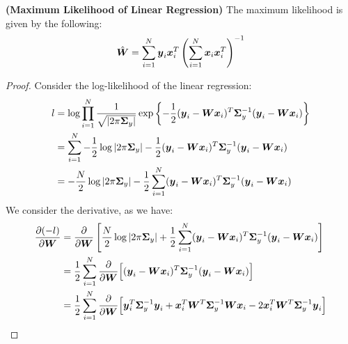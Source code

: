 \begin{proposition}{\textbf{(Maximum Likelihood of Linear Regression)}}
    The maximum likelihood is given by the following:
    \begin{equation*}
        \hat{\boldsymbol W} = \sum^N_{i=1}\boldsymbol y_i\boldsymbol x_i^T\left( \sum^N_{i=1}\boldsymbol x_i\boldsymbol x_i^T \right)^{-1}
    \end{equation*}
\end{proposition}
\begin{proof}
    Consider the log-likelihood of the linear regression:
    \begin{equation*}
    \begin{aligned}
        l &= \log \prod^N_{i=1} \frac{1}{\sqrt{\left| 2\pi\boldsymbol \Sigma_y \right|}} \exp\left\{ -\frac{1}{2}(\boldsymbol y_i - \boldsymbol W\boldsymbol x_i)^T\boldsymbol \Sigma_y^{-1}(\boldsymbol y_i - \boldsymbol W\boldsymbol x_i) \right\} \\
        &= \sum^N_{i=1} -\frac{1}{2}\log \left| 2\pi\boldsymbol \Sigma_y \right| -\frac{1}{2}(\boldsymbol y_i - \boldsymbol W\boldsymbol x_i)^T\boldsymbol \Sigma_y^{-1}(\boldsymbol y_i - \boldsymbol W\boldsymbol x_i) \\\
        &= -\frac{N}{2}\log \left| 2\pi\boldsymbol \Sigma_y \right| -\frac{1}{2}\sum^N_{i=1}(\boldsymbol y_i - \boldsymbol W\boldsymbol x_i)^T\boldsymbol \Sigma_y^{-1}(\boldsymbol y_i - \boldsymbol W\boldsymbol x_i)
    \end{aligned}
    \end{equation*}
    We consider the derivative, as we have:    
    \allowdisplaybreaks
    \begin{align*}
        \frac{\partial (-l)}{\partial \boldsymbol W} &= \frac{\partial}{\partial \boldsymbol W} \brackb{ \frac{N}{2}\log \abs{2\pi\boldsymbol \Sigma_y} +\frac{1}{2}\sum^N_{i=1} (\boldsymbol y_i - \boldsymbol W\boldsymbol x_i)^T\boldsymbol \Sigma_y^{-1}(\boldsymbol y_i - \boldsymbol W\boldsymbol x_i) } \\ 
        &= \frac{1}{2}\sum^N_{i=1}\frac{\partial}{\partial \boldsymbol W}\Big[(\boldsymbol y_i - \boldsymbol W\boldsymbol x_i)^T\boldsymbol \Sigma_y^{-1}(\boldsymbol y_i - \boldsymbol W\boldsymbol x_i) \Big] \\
        &= \frac{1}{2}\sum^N_{i=1}\frac{\partial}{\partial \boldsymbol W}\Big[ \boldsymbol y_i^T\boldsymbol \Sigma_y^{-1} \boldsymbol y_i + \boldsymbol x_i^T\boldsymbol W^T\boldsymbol \Sigma_y^{-1}\boldsymbol W\boldsymbol x_i - 2\boldsymbol x_i^T\boldsymbol W^T\boldsymbol \Sigma_y^{-1}\boldsymbol y_i \Big] \\

\end{align*}
\end{proof}
